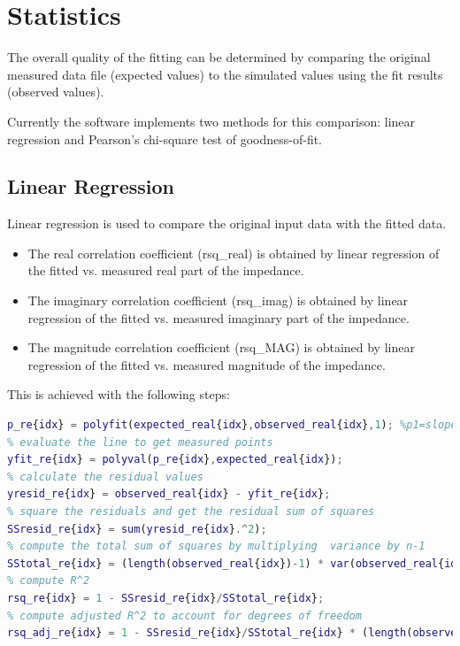 \documentclass[10pt,b5paper,oneside]{book}
\begin{document}
\newpage
\section{Statistics}

The overall quality of the fitting can be determined by comparing the original measured data file (expected values) to the simulated values using the fit results (observed values).

Currently the software implements two methods for this comparison: linear regression and Pearson's chi-square test of goodness-of-fit.

\subsection{Linear Regression}

Linear regression is used to compare the original input data with the fitted data.

\begin{itemize}
	\item The real correlation coefficient (rsq\_real) is obtained by linear regression of the fitted vs. measured real part of the impedance. 
	\item The imaginary correlation coefficient (rsq\_imag) is obtained by linear regression of the fitted vs. measured imaginary part of the impedance.
	\item The magnitude correlation coefficient (rsq\_MAG) is obtained by linear regression of the fitted vs. measured magnitude of the impedance.	
\end{itemize}

This is achieved with the following steps:


\begin{lstlisting}[language=Matlab, basicstyle=\scriptsize]
% linear fit using polyfit
p_re{idx} = polyfit(expected_real{idx},observed_real{idx},1); %p1=slope, p2=intersect
% evaluate the line to get measured points
yfit_re{idx} = polyval(p_re{idx},expected_real{idx});
% calculate the residual values
yresid_re{idx} = observed_real{idx} - yfit_re{idx};
% square the residuals and get the residual sum of squares
SSresid_re{idx} = sum(yresid_re{idx}.^2);
% compute the total sum of squares by multiplying  variance by n-1
SStotal_re{idx} = (length(observed_real{idx})-1) * var(observed_real{idx});
% compute R^2
rsq_re{idx} = 1 - SSresid_re{idx}/SStotal_re{idx};
% compute adjusted R^2 to account for degrees of freedom
rsq_adj_re{idx} = 1 - SSresid_re{idx}/SStotal_re{idx} * (length(observed_real{idx})-1)/(length(observed_real{idx})-length(p_re{idx}));
\end{lstlisting}
\end{document}
